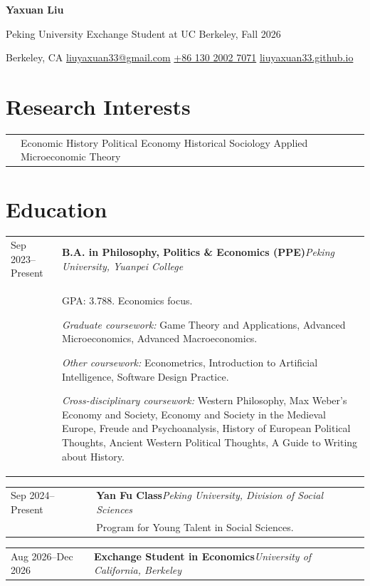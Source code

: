 \documentclass[10pt,a4paper]{article}
\makeatletter
\newcommand{\cvdate}[1]{\small\sffamily\color{muted}#1}
\newcommand{\institution}[1]{\small\itshape\color{muted}#1}
\newcommand{\cventry}[4]{%
  \begin{tabularx}{\textwidth}{@{}>{\raggedleft\arraybackslash}p{0.155\textwidth}@{\hspace{0.85em}}X@{}}
    \cvdate{#1} & \textbf{#2}\hfill\institution{#3}\\[-0.22em]
                 & #4
  \end{tabularx}\par\vspace{0.34em}
}
\newcommand{\cvshortentry}[3]{%
  \begin{tabularx}{\textwidth}{@{}>{\raggedleft\arraybackslash}p{0.155\textwidth}@{\hspace{0.85em}}X@{}}
    \cvdate{#1} & \textbf{#2}\hfill\institution{#3}
  \end{tabularx}\par\vspace{0.34em}
}
\newcommand{\cvline}[2]{%
  \begin{tabularx}{\textwidth}{@{}>{\raggedleft\arraybackslash}p{0.155\textwidth}@{\hspace{0.85em}}X@{}}
    \cvdate{#1} & #2
  \end{tabularx}\par\vspace{0.16em}
}
\makeatother
\begin{document}
\begin{center}
  {\fontsize{25}{29}\selectfont\bfseries\sffamily\color{navy}Yaxuan Liu}\par
  \vspace{0.22em}
  {\small Peking University \textbar{} Exchange Student at UC Berkeley, Fall 2026}\par
  \vspace{0.30em}
  {\small\sffamily
    Berkeley, CA
    \enspace\textcolor{rulegray}{\textbullet}\enspace
    \href{mailto:liuyaxuan33@gmail.com}{liuyaxuan33@gmail.com}
    \enspace\textcolor{rulegray}{\textbullet}\enspace
    \href{tel:+8613020027071}{+86 130 2002 7071}
    \enspace\textcolor{rulegray}{\textbullet}\enspace
    \href{https://liuyaxuan33.github.io}{liuyaxuan33.github.io}
  }
\end{center}

\vspace{-0.25em}
\section{Research Interests}
\cvline{}{Economic History \textcolor{rulegray}{\textbullet} Political Economy
  \textcolor{rulegray}{\textbullet} Historical Sociology
  \textcolor{rulegray}{\textbullet} Applied Microeconomic Theory}

\section{Education}
\cventry{Sep 2023--Present}{B.A. in Philosophy, Politics \& Economics (PPE)}{Peking University, Yuanpei College}{
  GPA: 3.788. Economics focus.\par
  \textit{Graduate coursework:} Game Theory and Applications, Advanced Microeconomics, Advanced Macroeconomics.\par
  \textit{Other coursework:} Econometrics, Introduction to Artificial Intelligence, Software Design Practice.\par
  \textit{Cross-disciplinary coursework:} Western Philosophy, Max Weber's Economy and Society, Economy and Society in the Medieval Europe, Freude and Psychoanalysis, History of European Political Thoughts, Ancient Western Political Thoughts, A Guide to Writing about History.
}
\cventry{Sep 2024--Present}{Yan Fu Class}{Peking University, Division of Social Sciences}{
  Program for Young Talent in Social Sciences.
}
\cvshortentry{Aug 2026--Dec 2026}{Exchange Student in Economics}{University of California, Berkeley}
\end{document}
